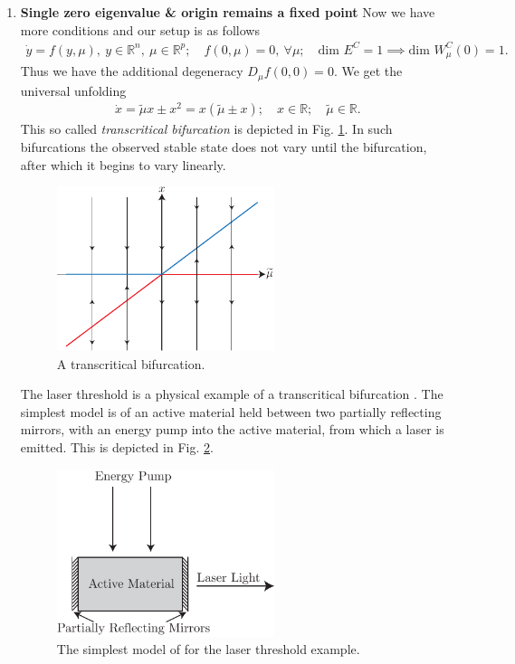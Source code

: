 \begin{enumerate}
	\item \textbf{Single zero eigenvalue \& origin remains a fixed point} 	
		Now we have more conditions and our setup is as follows
		\begin{align}
			\dot{y} = f(y, \mu),\ y \in \mathbb{R}^{n},\ \mu\in \mathbb{R}^{p};\quad f(0,\mu )=0,\ \forall \mu ;\quad  \textrm{dim }E^{C}=1\implies  \textrm{dim } W^{C}_{\mu }(0)=1.  
		\end{align}
		Thus we have the additional degeneracy $D_{\mu }f(0,0)=0$. We get the universal unfolding 
		\begin{align}
			\dot{x} = \tilde{\mu }x \pm x^2 = x (\tilde{\mu } \pm x);\quad x \in \mathbb{R};\quad \tilde{\mu} \in \mathbb{R}.	
		\end{align}
		This so called \emph{transcritical bifurcation} is depicted in Fig. \ref{fig:transcrit_bif}. In such bifurcations the observed stable state does not vary until the bifurcation, after which it begins to vary linearly.
		\begin{figure}[h!]
			\centering
			\includegraphics[width=0.6\textwidth]{figures/ch3/15transcrit_bif.pdf}
			\caption{A transcritical bifurcation.}
			\label{fig:transcrit_bif}
		\end{figure}
	\begin{ex}
		The laser threshold is a physical example of a transcritical bifurcation \cite{Strogatz, Haken1977}. The simplest model is of an active material held between two partially reflecting mirrors, with an energy pump into the active material, from which a laser is emitted. This is depicted in Fig. \ref{fig:laser_model}.
		\begin{figure}[h!]
			\centering
			\includegraphics[width=0.6\textwidth]{figures/ch3/15laser_threshold.pdf}
		\caption{The simplest model of for the laser threshold example.} %
			\label{fig:laser_model}
		\end{figure}
	

\end{ex}
\end{enumerate}

